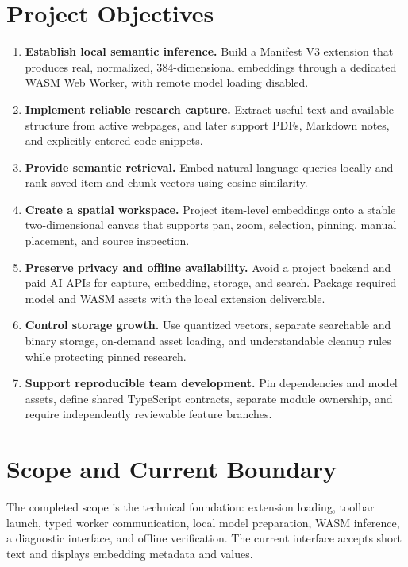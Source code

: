 \documentclass{tietreport}
\begin{document}
\section{Project Objectives}

\begin{enumerate}
  \item \textbf{Establish local semantic inference.} Build a Manifest V3 extension that
    produces real, normalized, 384-dimensional embeddings through a dedicated WASM Web
    Worker, with remote model loading disabled.

  \item \textbf{Implement reliable research capture.} Extract useful text and available
    structure from active webpages, and later support PDFs, Markdown notes, and explicitly
    entered code snippets.

  \item \textbf{Provide semantic retrieval.} Embed natural-language queries locally and rank
    saved item and chunk vectors using cosine similarity.

  \item \textbf{Create a spatial workspace.} Project item-level embeddings onto a stable
    two-dimensional canvas that supports pan, zoom, selection, pinning, manual placement,
    and source inspection.

  \item \textbf{Preserve privacy and offline availability.} Avoid a project backend and paid
    AI APIs for capture, embedding, storage, and search. Package required model and WASM
    assets with the local extension deliverable.

  \item \textbf{Control storage growth.} Use quantized vectors, separate searchable and binary
    storage, on-demand asset loading, and understandable cleanup rules while protecting
    pinned research.

  \item \textbf{Support reproducible team development.} Pin dependencies and model assets,
    define shared TypeScript contracts, separate module ownership, and require independently
    reviewable feature branches.
\end{enumerate}

\section{Scope and Current Boundary}

The completed scope is the technical foundation: extension loading, toolbar launch, typed
worker communication, local model preparation, WASM inference, a diagnostic interface, and
offline verification. The current interface accepts short text and displays embedding
metadata and values.
\end{document}
